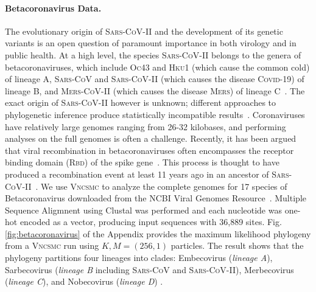 \documentclass[accepted]{uai2021} %
\theoremstyle{definition}
\begin{document}
\paragraph{Betacoronavirus Data.} The evolutionary origin of \textsc{Sars-CoV-II} and the development of its genetic variants is an open question of paramount importance in both virology and in public health. At a high level, the species \textsc{Sars-CoV-II} belongs to the genera of betacoronaviruses, which include \textsc{Oc43} and \textsc{Hku1} (which cause the common cold) of lineage A, \textsc{Sars-CoV} and \textsc{Sars-CoV-II} (which causes the disease \textsc{Covid-19}) of lineage B, and \textsc{Mers-CoV-II} (which causes the disease \textsc{Mers}) of lineage C~\citep{abf4c405af0c4229bee83cefc6b9501f}. The exact origin of \textsc{Sars-CoV-II} however is unknown; different approaches to phylogenetic inference produce statistically incompatible results~\citep{10.1093/molbev/msaa316}. Coronaviruses have relatively large genomes ranging from 26-32 kilobases, and performing analyses on the full genomes is often a challenge. Recently, it has been argued that viral recombination in betacoronaviruses often encompasses the receptor binding domain (\textsc{Rbd}) of the spike gene~\citep{Patino-Galindo2020.02.10.942748}. This process is thought to have produced a recombination event at least 11 years ago in an ancestor of \textsc{Sars-CoV-II}~\citep{Patino-Galindo2020.02.10.942748}. We use \textsc{Vncsmc} to analyze the complete genomes for 17 species of Betacoronavirus downloaded from the NCBI Viral Genomes Resource~\citep{10.1093/nar/gku1207}. Multiple Sequence Aligmnent using Clustal was performed and each nucleotide was one-hot encoded as a vector, producing input sequences with 36,889 sites. Fig. \ref{fig:betacoronavirus} of the Appendix provides the maximum likelihood phylogeny from a \textsc{Vncsmc} run using $K,M=(256,1)$ particles. The result shows that the phylogeny partitions four lineages into clades: Embecovirus (\textit{lineage A}), Sarbecovirus (\textit{lineage B} including \textsc{Sars-CoV} and \textsc{Sars-CoV-II}), Merbecovirus (\textit{lineage C}), and Nobecovirus (\textit{lineage D}) \citep{clwppgprgpkn13, whly10, 10.1371/journal.pone.0194527}.






\end{document}
